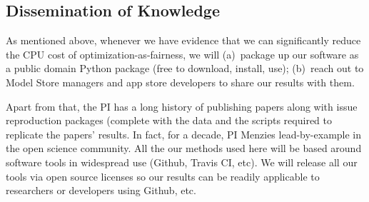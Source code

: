 \documentclass{NSF}
\begin{document}
\begin{nsfdescription}




%
\subsection{Dissemination of Knowledge}

As mentioned above, whenever we have evidence that we can significantly reduce the CPU cost of optimization-as-fairness, we will (a)~package up our software as a public domain Python package (free to download, install, use); (b)~reach out to Model Store managers and app store developers to share our results with them.

Apart from that, the PI has a long history of publishing papers along with issue reproduction packages (complete with the data and the scripts required to replicate the papers' results. 
In fact, for a decade, PI Menzies lead-by-example in the open science community. All the our methods used here will be based around software tools in widespread use (Github, Travis CI, etc). We will release all our tools via open source licenses so our results can be readily applicable to researchers or developers using Github, etc. 


\end{nsfdescription}
\end{document}
